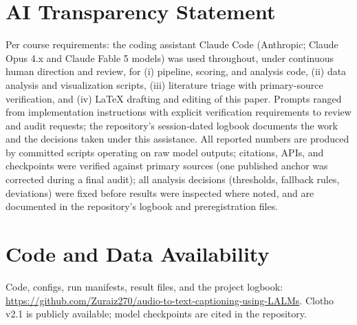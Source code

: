 \documentclass[conference]{IEEEtran}
\begin{document}
\section*{AI Transparency Statement}
Per course requirements: the coding assistant Claude Code (Anthropic; Claude
Opus 4.x and Claude Fable 5 models) was used throughout, under continuous
human direction and review, for (i) pipeline, scoring, and analysis code,
(ii) data analysis and visualization scripts, (iii) literature triage with
primary-source verification, and (iv) LaTeX drafting and editing of this
paper. Prompts ranged from implementation instructions with explicit
verification requirements to review and audit requests; the repository's
session-dated logbook documents the work and the decisions taken under this
assistance. All reported numbers are
produced by committed scripts operating on raw model outputs; citations,
APIs, and checkpoints were verified against primary sources (one published
anchor was corrected during a final audit); all analysis
decisions (thresholds, fallback rules, deviations) were fixed before results
were inspected where noted, and are documented in the repository's logbook
and preregistration files.

\section*{Code and Data Availability}
Code, configs, run manifests, result files, and the project logbook:
\url{https://github.com/Zuraiz270/audio-to-text-captioning-using-LALMs}.
Clotho v2.1 is publicly available; model checkpoints are cited in the
repository.



\end{document}
